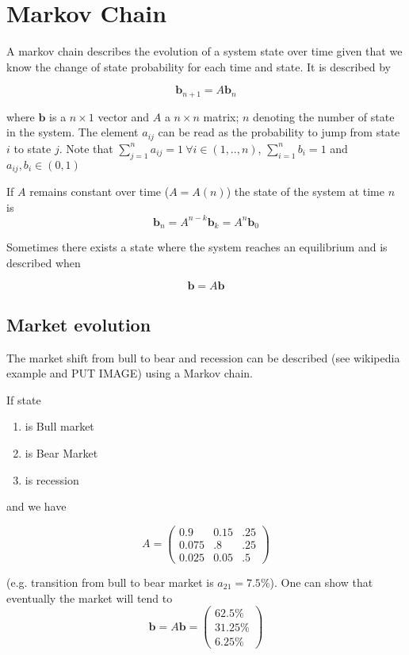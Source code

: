 \section{Markov Chain}

A markov chain describes the evolution of a system state over time given that we know the change of state probability for each time and state. It is described by 

\begin{equation}
\mathbf{b}_{n+1} = A\mathbf{b}_{n}
\end{equation}

where $\mathbf{b}$ is a $n\times 1$ vector and $A$ a $n\times n$ matrix; $n$ denoting the number of state in the system. The element $a_{ij}$ can be read as the probability to jump from state $i$ to state $j$. Note that $\sum_{j=1}^n a_{ij}=1~\forall i\in(1, .., n)$, $\sum_{i=1}^nb_i=1$ and $a_{ij},b_i\in(0,1)$ 

If $A$ remains constant over time ($A=A(n)$) the state of the system at time $n$ is
\begin{equation}
\mathbf{b}_n = A^{n-k}\mathbf{b}_k= A^n\mathbf{b}_0
\end{equation}

Sometimes there exists a state where the system reaches an equilibrium and is described when

\begin{equation}
\mathbf{b} = A\mathbf{b}
\end{equation}

\subsection{Market evolution}

The market shift from bull to bear and recession can be described (see wikipedia example and PUT IMAGE) using a Markov chain.

If state 
\begin{enumerate}
\item is Bull market
\item is Bear Market
\item is recession
\end{enumerate}
and we have

\begin{equation}
A =
\begin{pmatrix}
0.9	& 0.15	& .25 \\
0.075	& .8		& .25\\
0.025 & 0.05		& .5
\end{pmatrix}
\end{equation}

(e.g. transition from bull to bear market is $a_{21}=7.5\%$). One can show that eventually the market will tend to
\begin{equation}
\mathbf{b} = A\mathbf{b} = 
\begin{pmatrix}
62.5\%\\
31.25\%\\
6.25\%
\end{pmatrix}
\end{equation}